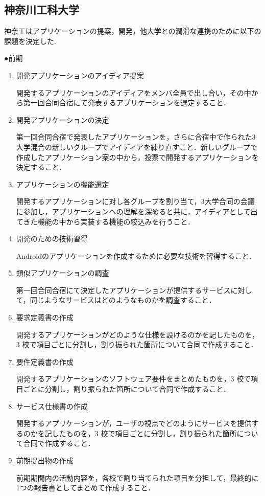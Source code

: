 \subsection{神奈川工科大学}
神奈工はアプリケーションの提案，開発，他大学との潤滑な連携のために以下の課題を決定した.
\par●前期
\begin{enumerate}
\item 開発アプリケーションのアイディア提案
\par 開発するアプリケーションのアイディアをメンバ全員で出し合い，その中から第一回合同合宿にて発表するアプリケーションを選定すること．
\item 開発アプリケーションの決定
\par 第一回合同合宿で発表したアプリケーションを，さらに合宿中で作られた3大学混合の新しいグループでアイディアを練り直すこと．新しいグループで作成したアプリケーション案の中から，投票で開発するアプリケーションを決定すること．
\item アプリケーションの機能選定
\par 開発するアプリケーションに対し各グループを割り当て，3大学合同の会議に参加し，アプリケーションへの理解を深めると共に，アイディアとして出てきた機能の中から実装する機能の絞込みを行うこと．
\item 開発のための技術習得
\par Androidのアプリケーションを作成するために必要な技術を習得すること．
\item 類似アプリケーションの調査
\par 第一回合同合宿にて決定したアプリケーションが提供するサービスに対して，同じようなサービスはどのようなものかを調査すること．
\item 要求定義書の作成
\par 開発するアプリケーションがどのような仕様を設けるのかを記したものを，3 校で項目ごとに分割し，割り振られた箇所について合同で作成すること．
\item 要件定義書の作成
\par 開発するアプリケーションのソフトウェア要件をまとめたものを，3 校で項目ごとに分割し，割り振られた箇所について合同で作成すること．
\item サービス仕様書の作成
\par 開発するアプリケーションが，ユーザの視点でどのようにサービスを提供するのかを記したものを，3 校で項目ごとに分割し，割り振られた箇所について合同で作成すること．
\item 前期提出物の作成
\par 前期期間内の活動内容を，各校で割り当てられた項目を分担して，最終的に1つの報告書としてまとめて作成すること．
\end{enumerate}

